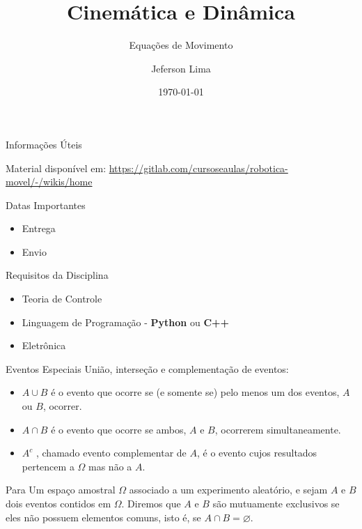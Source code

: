 \documentclass{beamer}
\title{Cinemática e Dinâmica}
\subtitle{Equações de Movimento}
\date{\today}
\author{Jeferson Lima}
\institute{\url{http://gitlab.com/jeferson.lima}}
\newcommand{\pausar}{\pause}
\begin{document}
\maketitle

\begin{frame}{Informações Úteis}
	\begin{block}{Material disponível em:}
		\href{Robótica Móvel - Wiki}{https://gitlab.com/cursoseaulas/robotica-movel/-/wikis/home}
	\end{block}
	\pausar
	\begin{block}{Datas Importantes}
		\begin{itemize}
		\item Entrega
		\item Envio
		\end{itemize}
	\end{block}
	\pausar
	\begin{block}{Requisitos da Disciplina}
		\begin{itemize}
		\item Teoria de Controle
		\item Linguagem de Programação - \textbf{Python} ou \textbf{C++}
		\item Eletrônica
		\end{itemize}
	\end{block}
\end{frame}



\begin{frame}{Eventos Especiais}
União, interseção e complementação de eventos:

\begin{itemize}
	\item $A  \cup B$ é o evento que ocorre se (e somente se) pelo menos um dos eventos, $A$ ou $B$, ocorrer.
	\item $A \cap B$ é o evento que ocorre se ambos, $A$ e $B$, ocorrerem simultaneamente.
	\item $A^c$ , chamado evento complementar de $A$, é o evento cujos resultados pertencem a $\Omega$ mas não a $A$.
\end{itemize}

\begin{block}{Para}
	Um espaço amostral $\Omega$ associado a um experimento aleatório, e sejam $A$ e $B$ dois eventos
	contidos em $\Omega$. Diremos que $A$ e $B$ são mutuamente exclusivos se eles não possuem elementos comuns,
	isto é, se $A \cap B = \varnothing$.
\end{block}

\end{frame}
\end{document}
